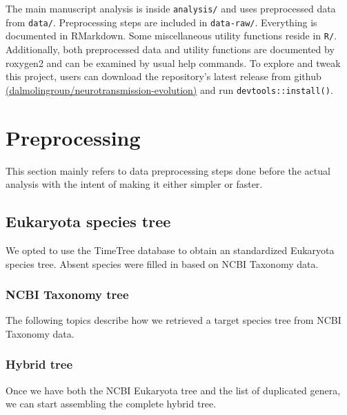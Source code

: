 \documentclass[
]{article}
\begin{document}
The main manuscript analysis is inside \texttt{analysis/} and uses
preprocessed data from \texttt{data/}. Preprocessing steps are included
in \texttt{data-raw/}. Everything is documented in RMarkdown. Some
miscellaneous utility functions reside in \texttt{R/}. Additionally,
both preprocessed data and utility functions are documented by roxygen2
and can be examined by usual help commands. To explore and tweak this
project, users can download the repository's latest release from github
\href{https://github.com/dalmolingroup/neurotransmission-evolution/releases}{(dalmolingroup/neurotransmission-evolution)}
and run \texttt{devtools::install()}.

\hypertarget{preprocessing}{%
\section{Preprocessing}\label{preprocessing}}

This section mainly refers to data preprocessing steps done before the
actual analysis with the intent of making it either simpler or faster.

\hypertarget{eukaryota-species-tree}{%
\subsection{Eukaryota species tree}\label{eukaryota-species-tree}}

We opted to use the TimeTree database to obtain an standardized
Eukaryota species tree. Absent species were filled in based on NCBI
Taxonomy data.

\hypertarget{ncbi-taxonomy-tree}{%
\subsubsection{NCBI Taxonomy tree}\label{ncbi-taxonomy-tree}}

The following topics describe how we retrieved a target species tree
from NCBI Taxonomy data.\\


\hypertarget{hybrid-tree}{%
\subsubsection{Hybrid tree}\label{hybrid-tree}}

Once we have both the NCBI Eukaryota tree and the list of duplicated
genera, we can start assembling the complete hybrid tree.\\

\end{document}
